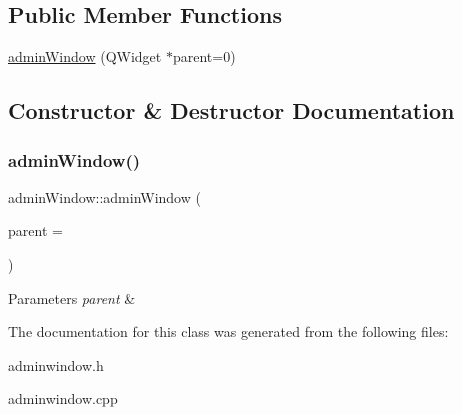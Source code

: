 \subsection*{Public Member Functions}
\begin{DoxyCompactItemize}
\item 
\hyperlink{classadmin_window_aa87a28958c1a314408df44e88c886ac5}{admin\+Window} (Q\+Widget $\ast$parent=0)
\end{DoxyCompactItemize}


\subsection{Constructor \& Destructor Documentation}
\mbox{\label{classadmin_window_aa87a28958c1a314408df44e88c886ac5}} 
\subsubsection{\texorpdfstring{admin\+Window()}{adminWindow()}}
{\footnotesize\ttfamily admin\+Window\+::admin\+Window (\begin{DoxyParamCaption}\item[{Q\+Widget $\ast$}]{parent = {} }\end{DoxyParamCaption})\hspace{0.3cm}{\ttfamily [explicit]}}


\begin{DoxyParams}{Parameters}
{\em parent} & \\
\hline
\end{DoxyParams}


The documentation for this class was generated from the following files\+:\begin{DoxyCompactItemize}
\item 
adminwindow.\+h\item 
adminwindow.\+cpp\end{DoxyCompactItemize}
